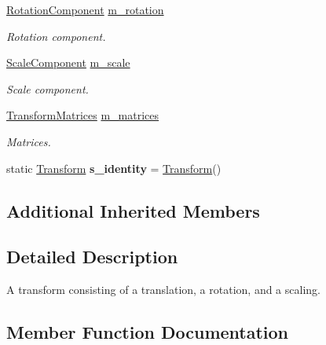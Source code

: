 \begin{DoxyCompactItemize}
\mbox{\label{classrev_1_1_transform_afc8621a7abbbb080b2acb7a879a2f44f}} 
\mbox{\hyperlink{classrev_1_1_rotation_component}{Rotation\+Component}} \mbox{\hyperlink{classrev_1_1_transform_afc8621a7abbbb080b2acb7a879a2f44f}{m\+\_\+rotation}}
\begin{DoxyCompactList}\small\item\em Rotation component. \end{DoxyCompactList}\item 
\mbox{\label{classrev_1_1_transform_a90f96d16837c7094a07ced126a960b0a}} 
\mbox{\hyperlink{classrev_1_1_scale_component}{Scale\+Component}} \mbox{\hyperlink{classrev_1_1_transform_a90f96d16837c7094a07ced126a960b0a}{m\+\_\+scale}}
\begin{DoxyCompactList}\small\item\em Scale component. \end{DoxyCompactList}\item 
\mbox{\label{classrev_1_1_transform_aad969ba4d89a84c637899666b94cdab9}} 
\mbox{\hyperlink{structrev_1_1_transform_matrices}{Transform\+Matrices}} \mbox{\hyperlink{classrev_1_1_transform_aad969ba4d89a84c637899666b94cdab9}{m\+\_\+matrices}}
\begin{DoxyCompactList}\small\item\em Matrices. \end{DoxyCompactList}\item 
\mbox{\label{classrev_1_1_transform_a2a57ca9c503ea5805b13e06ec62aa9c9}} 
static \mbox{\hyperlink{classrev_1_1_transform}{Transform}} {\bfseries s\+\_\+identity} = \mbox{\hyperlink{classrev_1_1_transform}{Transform}}()
\end{DoxyCompactItemize}
\subsection*{Additional Inherited Members}


\subsection{Detailed Description}
A transform consisting of a translation, a rotation, and a scaling. 

\subsection{Member Function Documentation}
\mbox{\label{classrev_1_1_transform_a1d5fb768c903b76184a9f9e7aac4fc21}} 
